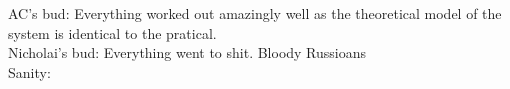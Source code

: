 \documentclass[../../main]{subfiles}
\begin{document}
AC's bud:
Everything worked out amazingly well as the theoretical model of the system is identical to the pratical. \\
Nicholai's bud:
Everything went to shit. Bloody Russioans
\\

Sanity:\\
\end{document}
